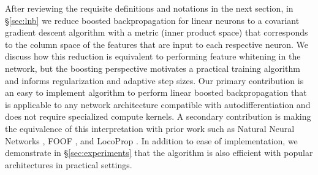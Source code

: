 After reviewing the requisite definitions and notations in the next section,
in \S \ref{sec:lnb} we reduce boosted backpropagation for linear neurons to 
a covariant gradient descent algorithm with a metric (inner product space) that corresponds to the
column space of the features that are input to each respective neuron. We discuss how this reduction is equivalent to performing
feature whitening in the network, but the boosting perspective motivates a practical
training algorithm and informs regularization and adaptive step sizes.
Our primary contribution is an easy to implement algorithm to
perform linear boosted backpropagation that is applicable to any network architecture compatible with
autodifferentiation and does not require specialized compute kernels.
A secondary contribution is making the equivalence of this interpretation with prior work such as
Natural Neural Networks \citep{nnn}, FOOF \citep{foof}, and LocoProp \cite{locoprop}.
In addition to ease of implementation, we demonstrate in \S \ref{sec:experiments} that the
algorithm is also efficient with popular architectures in practical settings.
